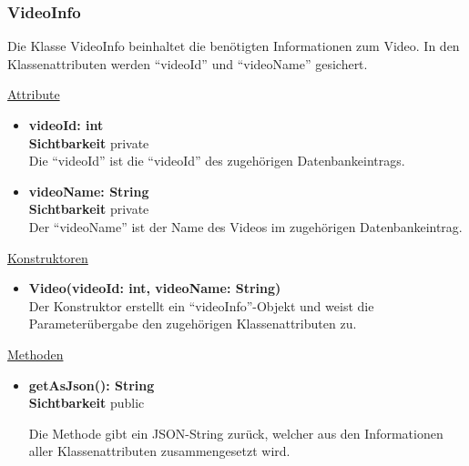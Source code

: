 \subsubsection{VideoInfo}
Die Klasse VideoInfo beinhaltet die benötigten Informationen zum Video. In den Klassenattributen werden ``videoId'' und ``videoName'' gesichert. \newline

\underline{Attribute}
\begin{itemize}
\itemsep0pt
\item \textbf{videoId: int} \hfill\\ 
\textbf{Sichtbarkeit} private \hfill\\  

Die ``videoId'' ist die ``videoId'' des zugehörigen Datenbankeintrags.

\item \textbf{videoName: String} \hfill\\ 
\textbf{Sichtbarkeit} private \hfill\\ 

Der ``videoName'' ist der Name des Videos im zugehörigen Datenbankeintrag.

\end{itemize}

\underline{Konstruktoren}
\begin{itemize}
\itemsep0pt
\item \textbf{Video(videoId: int, videoName: String)} \hfill\\

Der Konstruktor erstellt ein ``videoInfo''-Objekt und weist die Parameterübergabe den zugehörigen Klassenattributen zu.

\end{itemize}

\underline{Methoden}
\begin{itemize}
\itemsep0pt
\item \textbf{getAsJson(): String}\hfill\\
\textbf{Sichtbarkeit} public

Die Methode gibt ein JSON-String zurück, welcher aus den Informationen aller Klassenattributen zusammengesetzt wird.

\end{itemize}